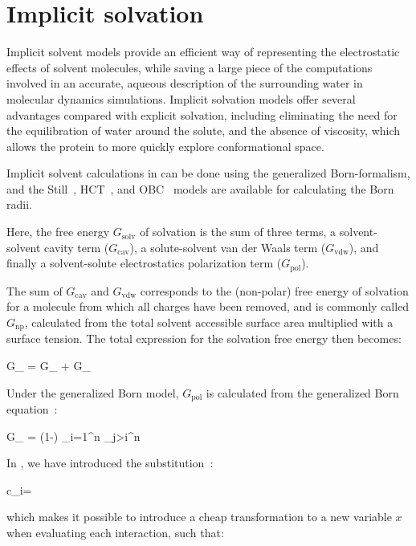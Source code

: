 \section{Implicit solvation}
\label{sec:gbsa}
Implicit solvent models provide an efficient way of representing 
the electrostatic effects of solvent molecules, while saving a 
large piece of the computations involved in an accurate, aqueous 
description of the surrounding water in molecular dynamics simulations. 
Implicit solvation models offer several advantages compared with 
explicit solvation, including eliminating the need for the equilibration of water 
around the solute, and the absence of viscosity, which allows the protein 
to more quickly explore conformational space.

Implicit solvent calculations in {\gromacs} can be done using the 
generalized Born-formalism, and the Still~\cite{Still97}, HCT~\cite{Truhlar96}, 
and OBC~\cite{Case04} models are available for calculating the Born radii.

Here, the free energy $G_{\mathrm{solv}}$ of solvation is the sum of three terms,
a solvent-solvent cavity term ($G_{\mathrm{cav}}$), a solute-solvent van der
Waals term ($G_{\mathrm{vdw}}$), and finally a solvent-solute electrostatics
polarization term ($G_{\mathrm{pol}}$).

The sum of $G_{\mathrm{cav}}$ and $G_{\mathrm{vdw}}$ corresponds to the (non-polar)
free energy of solvation for a molecule from which all charges
have been removed, and is commonly called $G_{\mathrm{np}}$,
calculated from the total solvent accessible surface area 
multiplied with a surface tension. 
The total expression for the solvation free energy then becomes:

\beq
G_{} = G_{}  + G_{}
\label{eqn:gb_solv}
\eeq

Under the generalized Born model, $G_{\mathrm{pol}}$ is calculated from the generalized Born equation~\cite{Still97}:

\beq
G_{} = \left(1-\right) \sum_{i=1}^n \sum_{j>i}^n 
\label{eqn:gb_still}
\eeq

In {\gromacs}, we have introduced the substitution~\cite{Larsson10}:

\beq
c_i=
\label{eqn:gb_subst}
\eeq

which makes it possible to introduce a cheap transformation to a new 
variable $x$ when evaluating each interaction, such that:

